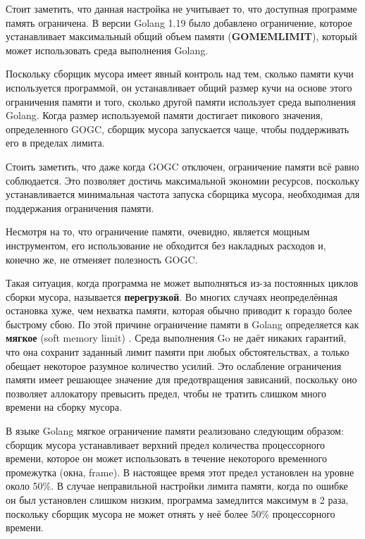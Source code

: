 Стоит заметить, что данная настройка не учитывает то, что доступная программе память ограничена. В версии Golang 1.19 было добавлено ограничение, которое устанавливает максимальный общий объем памяти (\textbf{GOMEMLIMIT}), который может использовать среда выполнения Golang. \cite{golang_1_19} \cite{golang_proposal_limit}

Поскольку сборщик мусора имеет явный контроль над тем, сколько памяти кучи используется программой, он устанавливает общий размер кучи на основе этого ограничения памяти и того, сколько другой памяти использует среда выполнения Golang. Когда размер используемой памяти достигает пикового значения, определенного GOGC, сборщик мусора запускается чаще, чтобы поддерживать его в пределах лимита. \cite{golang_gc_guide}

Стоить заметить, что даже когда GOGC отключен, ограничение памяти всё равно соблюдается. Это позволяет достичь максимальной экономии ресурсов, поскольку устанавливается минимальная частота запуска сборщика мусора, необходимая для поддержания ограничения памяти. \cite{golang_gc_guide}

Несмотря на то, что ограничение памяти, очевидно, является мощным инструментом, его использование не обходится без накладных расходов и, конечно же, не отменяет полезность GOGC. \cite{golang_gc_guide}

Такая ситуация, когда программа не может выполняться из-за постоянных циклов сборки мусора, называется \textbf{перегрузкой}. Во многих случаях неопределённая остановка хуже, чем нехватка памяти, которая обычно приводит к гораздо более быстрому сбою. По этой причине ограничение памяти в Golang определяется как \textbf{мягкое} (soft memory limit) \cite{golang_proposal_limit}. Среда выполнения Go не даёт никаких гарантий, что она сохранит заданный лимит памяти при любых обстоятельствах, а только обещает некоторое разумное количество усилий. Это ослабление ограничения памяти имеет решающее значение для предотвращения зависаний, поскольку оно позволяет аллокатору превысить предел, чтобы не тратить слишком много времени на сборку мусора. \cite{golang_gc_guide}

В языке Golang мягкое ограничение памяти реализовано следующим образом: сборщик мусора устанавливает верхний предел количества процессорного времени, которое он может использовать в течение некоторого временного промежутка (окна, frame). В настоящее время этот предел установлен на уровне около 50\%. В случае неправильной настройки лимита памяти, когда по ошибке он был установлен слишком низким, программа замедлится максимум в 2 раза, поскольку сборщик мусора не может отнять у неё более 50\% процессорного времени. \cite{golang_gc_guide}


